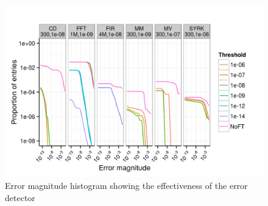 \documentclass{sig-alternate}
\begin{document}
\begin{figure}[ht!]
\centering
\includegraphics[width=1.00\columnwidth]{figs/4_1_1_Exp2_1_Example.png}
\caption{Error magnitude histogram showing the effectiveness of the error detector}
\label{fig:algo_err_dist}
\end{figure}
\end{document}
